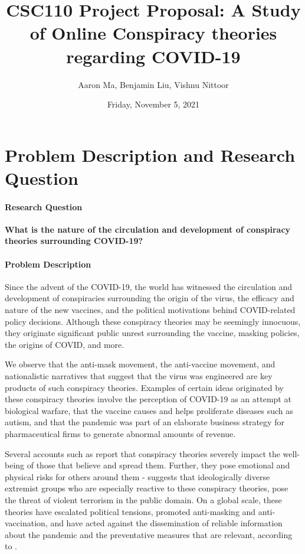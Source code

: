 \documentclass[fontsize=11pt]{article}
\title{CSC110 Project Proposal: A Study of Online Conspiracy theories regarding COVID-19}
\author{Aaron Ma, Benjamin Liu, Vishnu Nittoor}
\date{Friday, November 5, 2021}
\begin{document}
\maketitle

\section*{Problem Description and Research Question}

\paragraph{Research Question} \textbf{What is the nature of the circulation and development of conspiracy theories surrounding COVID-19?}

\paragraph{Problem Description} Since the advent of the COVID-19, the world has witnessed the circulation and development of conspiracies surrounding the origin of the virus, the efficacy and nature of the new vaccines, and the political motivations behind COVID-related policy decisions. Although these conspiracy theories may be seemingly innocuous, they originate significant public unrest surrounding the vaccine, masking policies, the origins of COVID, and more.

We observe that the anti-mask movement, the anti-vaccine movement, and nationalistic narratives that suggest that the virus was engineered are key products of such conspiracy theories. Examples of certain ideas originated by these conspiracy theories involve the perception of COVID-19 as an attempt at biological warfare, that the vaccine causes and helps proliferate diseases such as autism, and that the pandemic was part of an elaborate business strategy for pharmaceutical firms to generate abnormal amounts of revenue.

Several accounts such as \cite{PeopleWh91:online} report that conspiracy theories severely impact the well-being of those that believe and spread them. Further, they pose emotional and physical risks for others around them - \cite{10.2307/27040260} suggests that ideologically diverse extremist groups who are especially reactive to these conspiracy theories, pose the threat of violent terrorism in the public domain. On a global scale, these theories have escalated political tensions, promoted anti-masking and anti-vaccination, and have acted against the dissemination of reliable information about the pandemic and the preventative measures that are relevant, according to \cite{COVID19c99:online}. 
\end{document}
